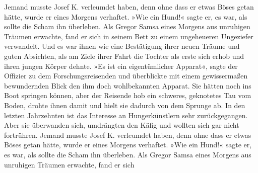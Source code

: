 \documentclass[11pt,ngerman,utf8]{g-brief}
\begin{document}
\begin{g-brief}
Jemand musste Josef K. verleumdet haben, denn ohne dass er etwas Böses getan
hätte, wurde er eines Morgens verhaftet. »Wie ein Hund!« sagte er, es war,
als sollte die Scham ihn überleben. Als Gregor Samsa eines Morgens aus
unruhigen Träumen erwachte, fand er sich in seinem Bett zu einem ungeheueren
Ungeziefer verwandelt. Und es war ihnen wie eine Bestätigung ihrer neuen Träume
und guten Absichten, als am Ziele ihrer Fahrt die Tochter als erste sich erhob und
ihren jungen Körper dehnte. »Es ist ein eigentümlicher Apparat«, sagte der Offizier
zu dem Forschungsreisenden und überblickte mit einem gewissermaßen bewundernden
Blick den ihm doch wohlbekannten Apparat. Sie hätten noch ins Boot springen
können, aber der Reisende hob ein schweres, geknotetes Tau vom Boden, drohte ihnen
damit und hielt sie dadurch von dem Sprunge ab. In den letzten Jahrzehnten
ist das Interesse an Hungerkünstlern sehr zurückgegangen.
Aber sie überwanden sich, umdrängten den Käfig und wollten sich gar nicht fortrühren.
Jemand musste Josef K. verleumdet haben, denn ohne dass er etwas Böses getan hätte,
wurde er eines Morgens verhaftet. »Wie ein Hund!« sagte er, es war,
als sollte die Scham ihn überleben.
Als Gregor Samsa eines Morgens aus unruhigen Träumen erwachte, fand er sich
\end{g-brief}
\end{document}
